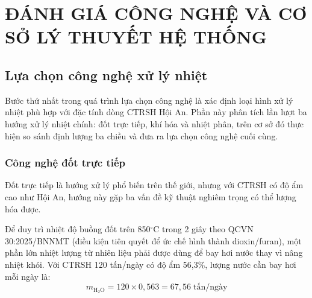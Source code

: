 \documentclass[../main.tex]{subfiles}
\begin{document}
\chapter{ĐÁNH GIÁ CÔNG NGHỆ VÀ CƠ SỞ LÝ THUYẾT HỆ THỐNG}
\label{chuong2}


\section{Lựa chọn công nghệ xử lý nhiệt}
\label{sec:lua-chon-cong-nghe}

Bước thứ nhất trong quá trình lựa chọn công nghệ là xác định loại hình xử lý nhiệt phù hợp với đặc tính dòng CTRSH Hội An. Phần này phân tích lần lượt ba hướng xử lý nhiệt chính: đốt trực tiếp, khí hóa và nhiệt phân, trên cơ sở đó thực hiện so sánh định lượng ba chiều và đưa ra lựa chọn công nghệ cuối cùng.

\subsection{Công nghệ đốt trực tiếp}
\label{sec:phan-tich-dot-truc-tiep}

Đốt trực tiếp là hướng xử lý phổ biến trên thế giới, nhưng với CTRSH có độ ẩm cao như Hội An, hướng này gặp ba vấn đề kỹ thuật nghiêm trọng có thể lượng hóa được.

Để duy trì nhiệt độ buồng đốt trên 850$^\circ\mathrm{C}$ trong 2 giây theo QCVN 30:2025/BNNMT (điều kiện tiên quyết để ức chế hình thành dioxin/furan), một phần lớn nhiệt lượng từ nhiên liệu phải được dùng để bay hơi nước thay vì nâng nhiệt khói. Với CTRSH 120 tấn/ngày có độ ẩm 56,3\%, lượng nước cần bay hơi mỗi ngày là:
\begin{equation}
m_{\text{H}_2\text{O}} = 120 \times 0{,}563 = 67{,}56 \;\text{tấn/ngày}
\end{equation}
\end{document}
